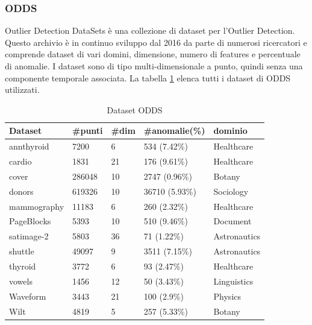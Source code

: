 \subsubsection{ODDS}
Outlier Detection DataSets è una collezione di dataset per l'Outlier Detection. Questo archivio è in continuo sviluppo dal 2016 da parte di numerosi ricercatori e comprende dataset di vari domini, dimensione, numero di features e percentuale di anomalie. 
I dataset sono di tipo multi-dimensionale a punto, quindi senza una componente temporale associata.
La tabella \ref{odds} elenca tutti i dataset di ODDS utilizzati.

\begin{table}
	
	\centering
	\begin{tabular}{|l|l|l|l|l|}
		\hline
		\textbf{Dataset} & \textbf{\#punti} & \textbf{\#dim} & \textbf{\#anomalie(\%)} & \textbf{dominio} \\ \hline
		annthyroid       & 7200              & 6              & 534 (7.42\%)            & Healthcare      \\ \hline
		cardio           & 1831              & 21             & 176 (9.61\%)            & Healthcare      \\ \hline
		cover            & 286048            & 10             & 2747 (0.96\%)           & Botany          \\ \hline
		donors           & 619326            & 10             & 36710 (5.93\%)          & Sociology       \\ \hline
		mammography      & 11183             & 6              & 260 (2.32\%)            & Healthcare      \\ \hline
		PageBlocks       & 5393              & 10             & 510 (9.46\%)            & Document        \\ \hline
		satimage-2       & 5803              & 36             & 71 (1.22\%)             & Astronautics    \\ \hline
		shuttle          & 49097             & 9              & 3511 (7.15\%)           & Astronautics    \\ \hline
		thyroid          & 3772              & 6              & 93 (2.47\%)             & Healthcare      \\ \hline
		vowels           & 1456              & 12             & 50 (3.43\%)             & Linguistics     \\ \hline
		Waveform         & 3443              & 21             & 100 (2.9\%)             & Physics         \\ \hline
		Wilt             & 4819              & 5              & 257 (5.33\%)            & Botany          \\ \hline
	\end{tabular}
	\caption{\label{odds}Dataset ODDS}
\end{table}

